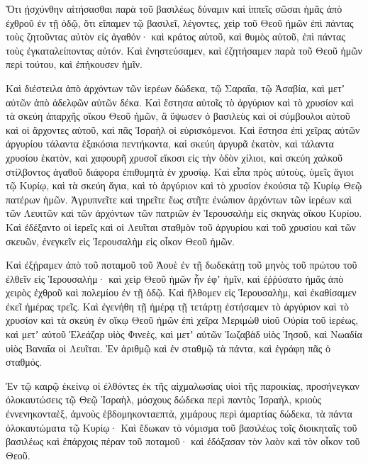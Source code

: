 {Ὅτι ᾐσχύνθην αἰτήσασθαι παρὰ τοῦ βασιλέως δύναμιν καὶ ἱππεῖς σῶσαι ἡμᾶς ἀπὸ ἐχθροῦ ἐν τῇ ὁδῷ, ὅτι εἴπαμεν τῷ βασιλεῖ, λέγοντες, χεὶρ τοῦ Θεοῦ ἡμῶν ἐπὶ πάντας τοὺς ζητοῦντας αὐτὸν εἰς ἀγαθόν· καὶ κράτος αὐτοῦ, καὶ θυμὸς αὐτοῦ, ἐπὶ πάντας τοὺς ἐγκαταλείποντας αὐτόν.
Καὶ ἐνηστεύσαμεν, καὶ ἐζητήσαμεν παρὰ τοῦ Θεοῦ ἡμῶν περὶ τούτου, καὶ ἐπήκουσεν ἡμῖν.
\par }{\PP {}Καὶ διέστειλα ἀπὸ ἀρχόντων τῶν ἱερέων δώδεκα, τῷ Σαραΐα, τῷ Ἀσαβία, καὶ μετʼ αὐτῶν ἀπὸ ἀδελφῶν αὐτῶν δέκα.
Καὶ ἔστησα αὐτοῖς τὸ ἀργύριον καὶ τὸ χρυσίον καὶ τὰ σκεύη ἀπαρχῆς οἴκου Θεοῦ ἡμῶν, ἃ ὕψωσεν ὁ βασιλεὺς καὶ οἱ σύμβουλοι αὐτοῦ καὶ οἱ ἄρχοντες αὐτοῦ, καὶ πᾶς Ἰσραὴλ οἱ εὑρισκόμενοι.
Καὶ ἔστησα ἐπὶ χεῖρας αὐτῶν ἀργυρίου τάλαντα ἑξακόσια πεντήκοντα, καὶ σκεύη ἀργυρᾶ ἑκατὸν, καὶ τάλαντα χρυσίου ἑκατὸν,
καὶ χαφουρῆ χρυσοῖ εἴκοσι εἰς τὴν ὁδὸν χίλιοι, καὶ σκεύη χαλκοῦ στίλβοντος ἀγαθοῦ διάφορα ἐπιθυμητὰ ἐν χρυσίῳ.
Καὶ εἶπα πρὸς αὐτοὺς, ὑμεῖς ἅγιοι τῷ Κυρίῳ, καὶ τὰ σκεύη ἅγια, καὶ τὸ ἀργύριον καὶ τὸ χρυσίον ἑκούσια τῷ Κυρίῳ Θεῷ πατέρων ἡμῶν.
Ἀγρυπνεῖτε καὶ τηρεῖτε ἕως στῆτε ἐνώπιον ἀρχόντων τῶν ἱερέων καὶ τῶν Λευιτῶν καὶ τῶν ἀρχόντων τῶν πατριῶν ἐν Ἱερουσαλὴμ εἰς σκηνὰς οἴκου Κυρίου.
Καὶ ἐδέξαντο οἱ ἱερεῖς καὶ οἱ Λευῖται σταθμὸν τοῦ ἀργυρίου καὶ τοῦ χρυσίου καὶ τῶν σκευῶν, ἐνεγκεῖν εἰς Ἱερουσαλὴμ εἰς οἶκον Θεοῦ ἡμῶν.
\par }{\PP {}Καὶ ἐξῄραμεν ἀπὸ τοῦ ποταμοῦ τοῦ Ἀουὲ ἐν τῇ δωδεκάτῃ τοῦ μηνὸς τοῦ πρώτου τοῦ ἐλθεῖν εἰς Ἱερουσαλήμ· καὶ χεὶρ Θεοῦ ἡμῶν ἦν ἐφʼ ἡμῖν, καὶ ἐῤῥύσατο ἡμᾶς ἀπὸ χειρὸς ἐχθροῦ καὶ πολεμίου ἐν τῇ ὁδῷ.
Καὶ ἤλθομεν εἰς Ἱερουσαλὴμ, καὶ ἐκαθίσαμεν ἐκεῖ ἡμέρας τρεῖς.
Καὶ ἐγενήθη τῇ ἡμέρᾳ τῇ τετάρτῃ ἐστήσαμεν τὸ ἀργύριον καὶ τὸ χρυσίον καὶ τὰ σκεύη ἐν οἴκῳ Θεοῦ ἡμῶν ἐπὶ χεῖρα Μεριμὼθ υἱοῦ Οὐρία τοῦ ἱερέως, καὶ μετʼ αὐτοῦ Ἐλεάζαρ υἱὸς Φινεὲς, καὶ μετʼ αὐτῶν Ἰωζαβὰδ υἱὸς Ἰησοῦ, καὶ Νωαδία υἱὸς Βαναΐα οἱ Λευῖται.
Ἐν ἀριθμῷ καὶ ἐν σταθμῷ τὰ πάντα, καὶ ἐγράφη πᾶς ὁ σταθμός.
\par }{\PP {}Ἐν τῷ καιρῷ ἐκείνῳ οἱ ἐλθόντες ἐκ τῆς αἰχμαλωσίας υἱοὶ τῆς παροικίας, προσήνεγκαν ὁλοκαυτώσεις τῷ Θεῷ Ἰσραὴλ, μόσχους δώδεκα περὶ παντὸς Ἰσραὴλ, κριοὺς ἐννενηκονταὲξ, ἀμνοὺς ἑβδομηκονταεπτὰ, χιμάρους περὶ ἁμαρτίας δώδεκα, τὰ πάντα ὁλοκαυτώματα τῷ Κυρίῳ·
Καὶ ἔδωκαν τὸ νόμισμα τοῦ βασιλέως τοῖς διοικηταῖς τοῦ βασιλέως καὶ ἐπάρχοις πέραν τοῦ ποταμοῦ· καὶ ἐδόξασαν τὸν λαὸν καὶ τὸν οἶκον τοῦ Θεοῦ.

}

